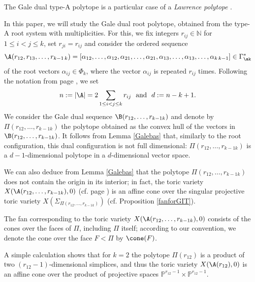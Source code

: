 \begin{rema}
The Gale dual type-A polytope is a particular case of a \textit{Lawrence 
polytope}  \cite{HSt}.
\end{rema}

In this paper, we will study the Gale dual root polytope, obtained from the type-A root system with multiplicities. For this, we fix integers  $r_{ij}\in\mathbb{N}$ for $ 1\leq i< j\leq k$, set $r_{ji}=r_{ij}$ and consider the ordered sequence 
\begin{equation}\label{A}
\A(r_{12},r_{13}, \ldots ,r_{k-1\,k}) = 
[\alpha_{12}, \ldots ,\alpha_{12},\alpha_{21}, \ldots ,\alpha_{21},\alpha_{13}, \ldots ,\alpha_{13}, \ldots ,\alpha_{k\,
 k-1}]\in\Gamma_{\ak}^*
\end{equation}
of the root vectors $\alpha_{ij}\in\Phi_k$, where the vector $\alpha_{ij}$ is 
repeated $r_{ij}$ times. Following the notation from page \pageref{seq:toric}, 
we set 
$$n:=|\A| = 2\sum_{1\leq i< j\leq k}r_{ij} \text{\,\, and \,\,} d: = n-k+1.$$
We consider the Gale dual sequence $\B(r_{12}, \ldots ,r_{k-1 k})$ and denote by 
$\Pi(r_{12}, \ldots ,r_{k-1 k})$ the polytope obtained as the convex hull of the 
vectors in $\B(r_{12}, \ldots ,r_{k-1 k})$. It follows from Lemma \ref{Galebas} 
that, similarly to the root configuration, this dual configuration is not full 
dimensional: $\Pi(r_{12}, \ldots ,r_{k-1 k})$ is a $d-1$-dimensional polytope in a 
$d$-dimensional vector space.



We can also deduce from Lemma \ref{Galebas} that the polytope $\Pi(r_{12}, \ldots ,r_{k-1 k})$ does not contain the origin in its interior;
in fact, the toric variety $X(\A(r_{12}, \ldots ,r_{k-1 k}), 0)$ (cf.  page 
\pageref{X_0def}) is an affine cone over the singular projective toric variety 
$X(\Sigma_{\Pi(r_{12}, \ldots ,r_{k-1 k})})$ (cf.  Proposition \ref{fanforGIT}).

\begin{nota}
The fan corresponding to the toric variety 
$X(\A(r_{12}, \ldots ,r_{k-1 k}), 0)$ consists of the cones over the faces of $\Pi$, 
including $\Pi$ itself; according to our convention, we denote the cone over 
the face $F<\Pi$ by $\cone(F)$.
\end{nota}

\begin{exam}\label{k=2space}
A simple calculation shows that for $k=2$  the polytope $\Pi(r_{12})$ is a product of two $(r_{12}-1)$-dimensional simplices, and thus the toric variety $X(\A(r_{12}), 0)$ is an affine cone over the product of projective spaces $\mathbb{P}^{r_{12}-1}\times\mathbb{P}^{r_{12}-1}$.
\end{exam}




